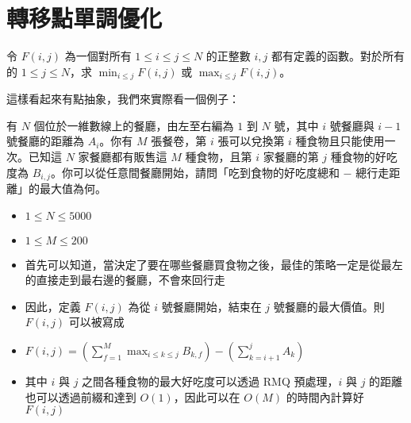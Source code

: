 \documentclass[standalone]{beamer}
\begin{document}
\section{轉移點單調優化}

\begin{frame}{}
  \begin{problem}
    令 $F(i, j)$ 為一個對所有 $1 \leq i \leq j \leq N$ 的正整數 $i, j$ 都有定義的函數。對於所有的 $1 \leq j \leq N$，求 $\min_{i \leq j}F(i, j)$ 或 $\max_{i \leq j}F(i, j)$。
  \end{problem}
  這樣看起來有點抽象，我們來實際看一個例子：
\end{frame}

\begin{frame}{}
  \begin{problem}
    有 $N$ 個位於一維數線上的餐廳，由左至右編為 $1$ 到 $N$ 號，其中 $i$ 號餐廳與 $i - 1$ 號餐廳的距離為 $A_i$。你有 $M$ 張餐卷，第 $i$ 張可以兌換第 $i$ 種食物且只能使用一次。已知這 $N$ 家餐廳都有販售這 $M$ 種食物，且第 $i$ 家餐廳的第 $j$ 種食物的好吃度為 $B_{i, j}$。你可以從任意間餐廳開始，請問「吃到食物的好吃度總和 $-$ 總行走距離」的最大值為何。
    
    \begin{itemize}
      \item $1 \leq N \leq 5000$
      \item $1 \leq M \leq 200$
    \end{itemize}
  \end{problem}
\end{frame}

\begin{frame}{}
  \begin{itemize}
    \item 首先可以知道，當決定了要在哪些餐廳買食物之後，最佳的策略一定是從最左的直接走到最右邊的餐廳，不會來回行走
    \item 因此，定義 $F(i, j)$ 為從 $i$ 號餐廳開始，結束在 $j$ 號餐廳的最大價值。則 $F(i, j)$ 可以被寫成
    \item $F(i, j) = \left(\sum_{f = 1}^{M}\max_{i \leq k \leq j}B_{k, f}\right) - \left(\sum_{k = i + 1}^{j}A_k\right)$
    \item 其中 $i$ 與 $j$ 之間各種食物的最大好吃度可以透過 RMQ 預處理，$i$ 與 $j$ 的距離也可以透過前綴和達到 $O(1)$，因此可以在 $O(M)$ 的時間內計算好 $F(i, j)$
  \end{itemize}
\end{frame}
\end{document}
